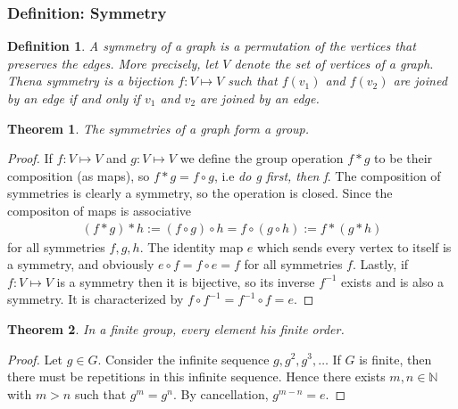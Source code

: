 \documentclass{article}
\theoremstyle{plain}
\newtheorem{theorem}{Theorem}
\newtheorem{definition}{Definition}
\begin{document}
\subsubsection{Definition: Symmetry}
\begin{definition}
    A \textit{symmetry} of a graph is a permutation of the vertices that preserves the edges. More precisely, let \(V\) denote the set of vertices of a graph. Thena  symmetry is a bijection \(f : V \mapsto V\) such that \(f(v_1)\) and \(f(v_2)\) are joined by an edge if and only if \(v_1\) and \(v_2\) are joined by an edge.
\end{definition}


\begin{theorem}

    The symmetries of a graph form a group.

\end{theorem}

\begin{proof}
If \(f: V \mapsto V\) and \(g: V \mapsto V\) we define the group operation \(f * g\) to be their composition (as maps), so \(f * g = f \circ g\), i.e \textit{do g first, then f}. The composition of symmetries is clearly a symmetry, so the operation is closed. Since the compositon of maps is associative
\begin{align*}
    (f * g) * h :=(f \circ g) \circ h = f \circ (g \circ h) := f * (g * h)
\end{align*}
for all symmetries \(f, g, h\). The identity map \(e\) which sends every vertex to itself is a symmetry, and obviously \(e \circ f = f \circ e = f\) for all symmetries \(f\). Lastly, if \(f: V \mapsto V\) is a symmetry then it is bijective, so its inverse \(f^{-1}\) exists and is also a symmetry. It is characterized by \(f \circ f^{-1} = f^{-1} \circ f = e\).

\end{proof}

\begin{theorem}
    In a finite group, every element his finite order.
\end{theorem}

\begin{proof}
    Let \(g \in G\). Consider the infinite sequence \(g, g^2, g^3, \dots\) If \(G\) is finite, then there must be repetitions in this infinite sequence. Hence there exists \(m, n \in \mathbb{N}\) with \(m > n\) such that \(g^m = g^n\). By cancellation, \(g^{m-n} = e\).
\end{proof}
\end{document}
